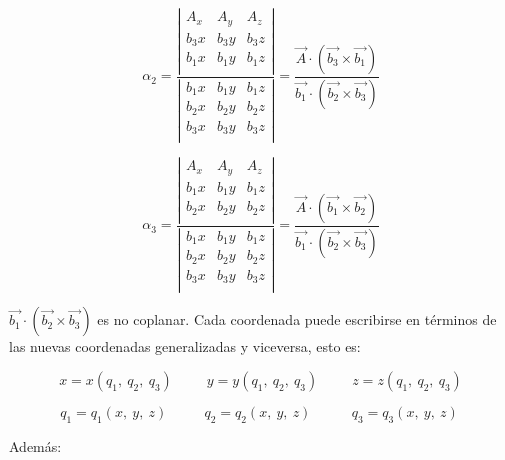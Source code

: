 \documentclass[]{article}
\begin{document}
\[\alpha_{2} = \frac{\left| \begin{matrix}
A_{x} & A_{y} & A_{z} \\
b_{3}x & b_{3}y & b_{3}z \\
b_{1}x & b_{1}y & b_{1}z \\
\end{matrix} \right|}{\left| \begin{matrix}
b_{1}x & b_{1}y & b_{1}z \\
b_{2}x & b_{2}y & b_{2}z \\
b_{3}x & b_{3}y & b_{3}z \\
\end{matrix} \right|} = \frac{\overrightarrow{A} \cdot \left( \overrightarrow{b_{3}} \times \overrightarrow{b_{1}} \right)}{\overrightarrow{b_{1}} \cdot \left( \overrightarrow{b_{2}} \times \overrightarrow{b_{3}} \right)}\]

\[\alpha_{3} = \frac{\left| \begin{matrix}
A_{x} & A_{y} & A_{z} \\
b_{1}x & b_{1}y & b_{1}z \\
b_{2}x & b_{2}y & b_{2}z \\
\end{matrix} \right|}{\left| \begin{matrix}
b_{1}x & b_{1}y & b_{1}z \\
b_{2}x & b_{2}y & b_{2}z \\
b_{3}x & b_{3}y & b_{3}z \\
\end{matrix} \right|} = \frac{\overrightarrow{A} \cdot \left( \overrightarrow{b_{1}} \times \overrightarrow{b_{2}} \right)}{\overrightarrow{b_{1}} \cdot \left( \overrightarrow{b_{2}} \times \overrightarrow{b_{3}} \right)}\]

\(\overrightarrow{b_{1}} \cdot \left( \overrightarrow{b_{2}} \times \overrightarrow{b_{3}} \right)\)
es no coplanar. Cada coordenada puede escribirse en términos de las
nuevas coordenadas generalizadas y viceversa, esto es:

\[x = x\left( q_{1},\ q_{2},\ q_{3} \right)\ \ \ \ \ \ \ \ \ \ \ y = y\left( q_{1},\ q_{2},\ q_{3} \right)\ \ \ \ \ \ \ \ \ \ \ z = z\left( q_{1},\ q_{2},\ q_{3} \right)\]

\[q_{1} = q_{1}(x,\ y,\ z)\ \ \ \ \ \ \ \ \ \ \ \ q_{2} = q_{2}(x,\ y,\ z)\ \ \ \ \ \ \ \ \ \ \ \ {\ q}_{3} = q_{3}(x,\ y,\ z)\ \]

Además:
\end{document}

